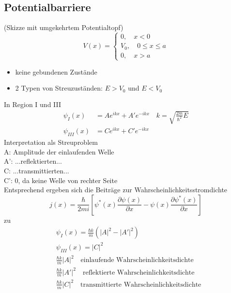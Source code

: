 \documentclass[10pt,article,colorback,accentcolor=tud9d]{scrartcl}
\begin{document}
\subsection{Potentialbarriere}
(Skizze mit umgekehrtem Potentialtopf)
\begin{equation}
V(x)=\left\{
\begin{aligned}
0,\quad x<0\\
V_0,\quad 0\leq x\leq a\\
0,\quad x>a
\end{aligned}
\right.
\end{equation}
\begin{itemize}
	\item keine gebundenen Zustände
  \item 2 Typen von Streuzuständen: $E>V_0$ und $E<V_0$
\end{itemize}
In Region I und III
\begin{align}
\psi_{I}(x)&=Ae^{ikx}+A'e^{-ikx} \quad k=\sqrt{\frac{2m}{\hbar^2}E}\\
\psi_{III}(x)&=Ce^{ikx}+C'e^{-ikx}
\end{align}
Interpretation als Streuproblem\\
A: Amplitude der einlaufenden Welle\\
A': ...reflektierten...\\
C: ...transmittierten...\\
C': 0, da keine Welle von rechter Seite\\
Entsprechend ergeben sich die Beiträge zur Wahrscheinlichkeitsstromdichte
\begin{equation}
j(x)=\frac{\hbar}{2mi}\left[\psi^*(x)\frac{\partial\psi(x)}{\partial x}-\psi(x)\frac{\partial\psi^*(x)}{\partial x}\right]
\end{equation}
zu
\begin{align}
&\psi_{I}(x)=\frac{\hbar k}{m}\left(|A|^2-|A'|^2\right)\\
&\psi_{III}(x)=|C|^2\\
&\frac{\hbar k}{m}|A|^2\quad \text{einlaufende Wahrscheinlichkeitsdichte}\\
&\frac{\hbar k}{m}|A'|^2\quad \text{reflektierte Wahrscheinlichkeitsdichte}\\
&\frac{\hbar k}{m}|C|^2\quad \text{transmittierte Wahrscheinlichkeitsdichte}
\end{align}
\end{document}
